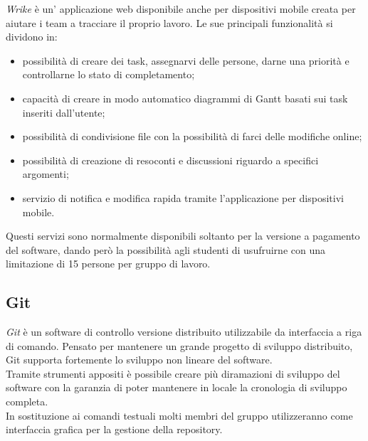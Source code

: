 \documentclass[./../NomeDocumento.tex]{subfiles}
\begin{document}
	\textit{Wrike} è un' applicazione web disponibile anche per dispositivi mobile creata per aiutare i team a tracciare il proprio lavoro. Le sue principali funzionalità si dividono in:
	\begin{itemize}
		\item possibilità di creare dei task, assegnarvi delle persone, darne una priorità e controllarne lo stato di completamento;
		\item capacità di creare in modo automatico diagrammi di Gantt basati sui task inseriti dall'utente;
		\item possibilità di condivisione file con la possibilità di farci delle modifiche online;
		\item possibilità di creazione di resoconti e discussioni riguardo a specifici argomenti;
		\item servizio di notifica e modifica rapida tramite l'applicazione per dispositivi mobile.
	\end{itemize}
	Questi servizi sono normalmente disponibili soltanto per la versione a pagamento del software, dando però la possibilità agli studenti di usufruirne con una limitazione di 15 persone per gruppo di lavoro.

	\subsection{Git}

	\textit{Git} è un software di controllo versione distribuito utilizzabile da interfaccia a riga di comando. Pensato per mantenere un grande progetto di sviluppo distribuito, Git supporta fortemente lo sviluppo non lineare del software.
	\\ \noindent Tramite strumenti appositi è possibile creare più diramazioni di sviluppo del software con la garanzia di poter mantenere in locale la cronologia di sviluppo completa.
	\\ \noindent In sostituzione ai comandi testuali molti membri del gruppo utilizzeranno  come interfaccia grafica per la gestione della repository.
\end{document}
